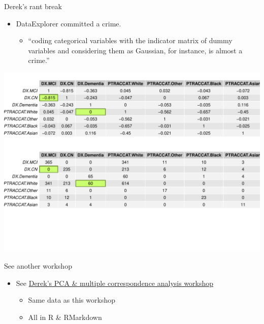 \documentclass[ignorenonframetext,]{beamer}
\providecommand{\tightlist}{%
  \setlength{\itemsep}{0pt}\setlength{\parskip}{0pt}}
\begin{document}
\begin{frame}{Derek's rant break}
\protect\hypertarget{dereks-rant-break}{}

\begin{itemize}
\tightlist
\item
  DataExplorer committed a crime.

  \begin{itemize}
  \tightlist
  \item
    ``coding categorical variables with the indicator matrix of dummy
    variables and considering them as Gaussian, for instance, is almost
    a crime.''
  \end{itemize}
\end{itemize}

\includegraphics{../external/images/categorical_nonsense.pdf}

\end{frame}

\begin{frame}{See another workshop}
\protect\hypertarget{see-another-workshop}{}

\begin{itemize}
\tightlist
\item
  See
  \href{https://github.com/derekbeaton/Workshops/tree/master/RTC/PCA_MCA_Resampling/}{Derek's
  PCA \& multiple correspondence analysis workshop}

  \begin{itemize}
  \tightlist
  \item
    Same data as this workshop
  \item
    All in R \& RMarkdown
  \end{itemize}
\end{itemize}

\end{frame}
\end{document}
